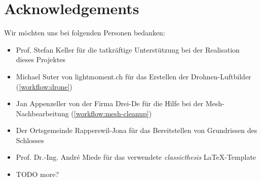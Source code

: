 

\bigskip


\begingroup

\let\clearpage\relax
\let\cleardoublepage\relax
\let\cleardoublepage\relax

\chapter*{Acknowledgements} %

Wir möchten uns bei folgenden Personen bedanken:

\begin{itemize}
	\item Prof. Stefan Keller für die tatkräftige Unterstützung bei der
		Realisation dieses Projektes
	\item Michael Suter von lightmoment.ch für das Erstellen der
		Drohnen-Luftbilder (\autoref{workflow:drone})
	\item Jan Appenzeller von der Firma Drei-De für die Hilfe bei der
		Mesh-Nachbearbeitung (\autoref{workflow:mesh-cleanup})
	\item Der Ortsgemeinde Rapperswil-Jona für das Bereitstellen von Grundrissen
		des Schlosses
	\item Prof. Dr.-Ing. André Miede für das verwendete \emph{classicthesis}
		\LaTeX-Template
	\item TODO more?
\end{itemize}


\endgroup
